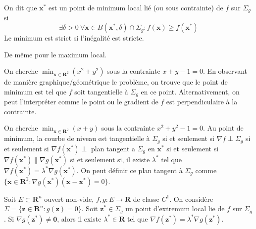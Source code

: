 \begin{definition}
On dit que $\boldsymbol{x}^{*}$ est un point de minimum local lié (ou sous contrainte) de $f$ sur $\Sigma _{g}$ si
$$
\exists\delta>0~\forall \boldsymbol{x}\in B(\boldsymbol{x}^{*},\delta)\cap\Sigma _{g}:f(\boldsymbol{x})\ge f(\boldsymbol{x}^{*})
$$
Le minimum est strict si l'inégalité est stricte.

De même pour le maximum local.
\end{definition}
\begin{example}
On cherche $\min_{\boldsymbol{x}\in \mathbf{R}^{2}}(x^{2}+y^{2})$ sous la contrainte $x+y-1=0$. En observant de manière graphique/géométrique le problème, on trouve que le point de minimum est tel que $f$ soit tangentielle à  $\Sigma _{g}$ en ce point. Alternativement, on peut l'interpréter comme le point ou le gradient de $f$ est perpendiculaire à la contrainte.
\end{example}
\begin{example}
On cherche $\min_{\boldsymbol{x}\in \mathbf{R}^{2}}(x+y)$ sous la contrainte $x^{2}+y^{2}-1=0$. Au point de minimum, la courbe de niveau est tangentielle à $\Sigma _{g}$ si et seulement si $\nabla f\perp\Sigma _{g}$ si et seulement si $\nabla f(\boldsymbol{x}^{*})\perp$ plan tangent a $\Sigma _{g}$ en $\boldsymbol{x}^{*}$ si et seulement si $\nabla f(\boldsymbol{x}^{*})\parallel \nabla g(\boldsymbol{x}^{*})$ si et seulement si, il existe $\lambda ^{*}$ tel que $\nabla f(\boldsymbol{x}^{*})=\lambda ^{*}\nabla g(\boldsymbol{x}^{*})$. On peut définir ce plan tangent à $\Sigma _{g}$ comme $\{ \boldsymbol{x}\in \mathbf{R}^{2}:\nabla g(\boldsymbol{x}^{*})(\boldsymbol{x}-\boldsymbol{x^{*}})=0 \}$.
\end{example}
\begin{theorem}
Soit $E\subset \mathbf{R}^{n}$ ouvert non-vide, $f,g:E\to \mathbf{R}$ de classe $C^{1}$. On considère $\Sigma=\{\boldsymbol{z}\in \mathbf{R}^{n}:g(\boldsymbol{z})=0 \}$. Soit $\boldsymbol{z}^{*}\in\Sigma _{g}$ un point d'extremum local lie de $f$ sur $\Sigma _{g}$. Si $\nabla g(\boldsymbol{z}^{*})\neq \boldsymbol{0}$, alors il existe $\lambda ^{*}\in \mathbf{R}$ tel que $\nabla f(\boldsymbol{z}^{*})=\lambda ^{*}\nabla g(\boldsymbol{z}^{*})$. 
\end{theorem}
